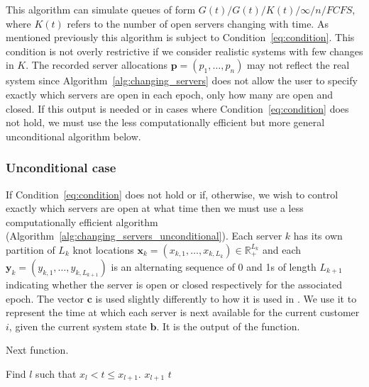 \documentclass[article]{jss}
\begin{document}
This algorithm can simulate queues of form $G(t)/G(t)/K(t)/\infty/n/\mathit{FCFS}$, where $K(t)$ refers to the number of open servers changing with time. As mentioned previously this algorithm is subject to Condition~\ref{eq:condition}. This condition is not overly restrictive if we consider realistic systems with few changes in $K$. The recorded server allocations $\mathbf{p} = (p_1, \ldots, p_n)$ may not reflect the real system since Algorithm~\ref{alg:changing_servers} does not allow the user to specify exactly which servers are open in each epoch, only how many are open and closed. If this output is needed or in cases where Condition~\ref{eq:condition} does not hold, we must use the less computationally efficient but more general unconditional algorithm below.  

\subsubsection{Unconditional case}

If Condition~\ref{eq:condition} does not hold or if, otherwise, we wish to control exactly which servers are open at what time then we must use a less computationally efficient algorithm (Algorithm~\ref{alg:changing_servers_unconditional}). Each server $k$ has its own partition of $L_k$ knot locations $\mathbf{x}_k = (x_{k,1}, \ldots, x_{k,L_k} ) \in \mathbb{R}^{L_k}_{+}$ and each $\mathbf{y}_k = (y_{k,1}, \ldots, y_{k,L_{k+1}} )$ is an alternating sequence of 0 and 1s of length $L_{k+1}$ indicating whether the server is open or closed respectively for the associated epoch. The vector $\mathbf{c}$ is used slightly differently to how it is used in \citet{sutton_bayesian_2011}. We use it to represent the time at which each server is next available for the current customer $i$, given the current system state $\mathbf{b}$. It is the output of the  function. 

\begin{algorithm}[t!]
\caption{Next function.}
\label{alg:next_fun}
\begin{algorithmic}
\State Find $l$ such that $x_{l} < t \leq x_{l+1}$.
\State \Return $x_{l+1}$
\Else
\State \Return $t$
\EndIf
\EndFunction
\end{algorithmic}
\end{algorithm}
\end{document}
